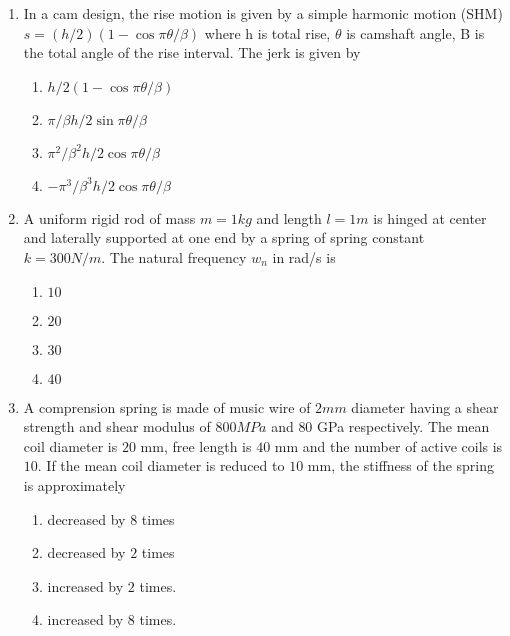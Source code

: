 \documentclass[journal]{IEEEtran}
\begin{document}
\begin{enumerate}[start=35]
    \item In  a cam design, the rise motion is given by a simple harmonic motion (SHM) \\$s=(h/2)(1-\cos{\pi\theta/\beta})$ where h is total rise, $\theta$ is camshaft angle, B is the total angle of the rise interval. The jerk is given by
    \begin{multicols}{2}
    \begin{enumerate}
        \item $h/2(1-\cos{\pi\theta/\beta})$
        \item $\pi/\beta h/2 \sin{\pi\theta/\beta}$
        \item $\pi^2/\beta^2 h/2 \cos{\pi\theta/\beta}$
        \item $-\pi^3/\beta^3 h/2 \cos{\pi\theta/\beta}$
    \end{enumerate}
    \end{multicols}
    \item A uniform rigid rod of mass $m=1kg$ and length $l= 1m$ is hinged at center and laterally supported at one end by a spring of spring constant $k = 300N/m$. The natural frequency $w_n$ in rad/s is 
    \begin{multicols}{4}
    \begin{enumerate}
        \item $10$
        \item $20$
        \item $30$
        \item $40$
    \end{enumerate}
    \end{multicols}
    \item A comprension spring is made of music wire of $2 mm$ diameter having a shear strength and shear modulus of $800 MPa$ and $80$ GPa respectively. The mean coil diameter is $20$ mm, free length is $40$ mm and the number of active coils is $10$. If the mean coil diameter is reduced to $10$ mm, the stiffness of the spring is approximately
    \begin{multicols}{4}
    \begin{enumerate}
        \item decreased by $8$ times
        \item decreased by $2$ times
        \item increased by $2$ times.
        \item increased by $8$ times.
    \end{enumerate}
    \end{multicols}


\end{enumerate}
\end{document}
